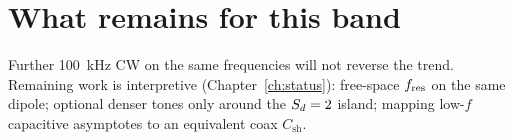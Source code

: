 \section{What remains for this band}

Further 100~kHz CW on the same frequencies will not reverse the trend. Remaining work is interpretive (Chapter~\ref{ch:status}): free-space \(f_{\mathrm{res}}\) on the same dipole; optional denser tones only around the \(S_d=2\) island; mapping low-\(f\) capacitive asymptotes to an equivalent coax \(C_{\mathrm{sh}}\).
